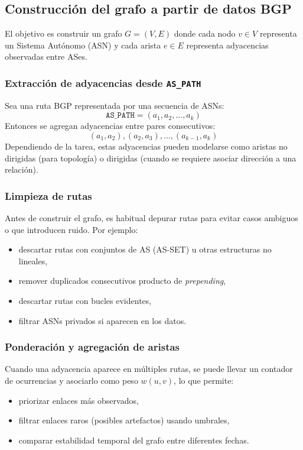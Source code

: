 \subsection{Construcción del grafo a partir de datos BGP}

El objetivo es construir un grafo $G=(V,E)$ donde cada nodo $v \in V$ representa un Sistema Autónomo (ASN) y cada arista $e \in E$ representa adyacencias observadas entre ASes.

\subsubsection{Extracción de adyacencias desde \texttt{AS\_PATH}}

Sea una ruta BGP representada por una secuencia de ASNs:
\[
\texttt{AS\_PATH} = (a_1, a_2, \dots, a_k)
\]
Entonces se agregan adyacencias entre pares consecutivos:
\[
(a_1,a_2), (a_2,a_3), \dots, (a_{k-1},a_k)
\]
Dependiendo de la tarea, estas adyacencias pueden modelarse como aristas no dirigidas (para topología) o dirigidas (cuando se requiere asociar dirección a una relación).

\subsubsection{Limpieza de rutas}

Antes de construir el grafo, es habitual depurar rutas para evitar casos ambiguos o que introducen ruido. Por ejemplo:
\begin{itemize}
    \item descartar rutas con conjuntos de AS (AS-SET) u otras estructuras no lineales,
    \item remover duplicados consecutivos producto de \textit{prepending},
    \item descartar rutas con bucles evidentes,
    \item filtrar ASNs privados si aparecen en los datos.
\end{itemize}

\subsubsection{Ponderación y agregación de aristas}

Cuando una adyacencia aparece en múltiples rutas, se puede llevar un contador de ocurrencias y asociarlo como peso $w(u,v)$, lo que permite:
\begin{itemize}
    \item priorizar enlaces más observados,
    \item filtrar enlaces raros (posibles artefactos) usando umbrales,
    \item comparar estabilidad temporal del grafo entre diferentes fechas.
\end{itemize}

